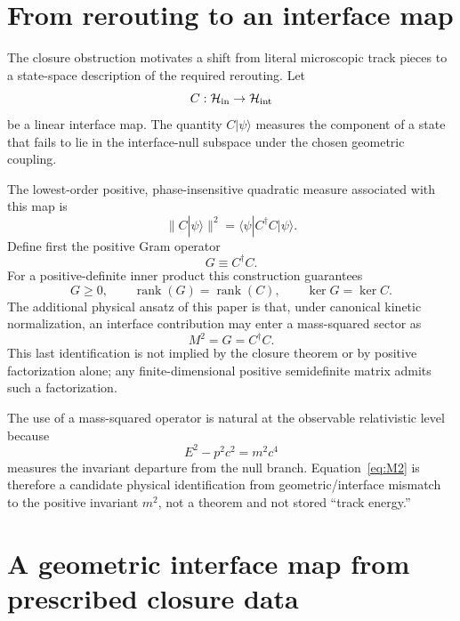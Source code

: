 \documentclass[10pt]{article}
\newcommand{\rank}{\operatorname{rank}}
\begin{document}
\section{From rerouting to an interface map}
\label{sec:interfaceMap}

The closure obstruction motivates a shift from literal microscopic track pieces to a state-space description of the required rerouting. Let
\begin{equation}
C:\mathcal H_{\rm in}\rightarrow\mathcal H_{\rm int}
\label{eq:Cgeneral}
\end{equation}
be a linear interface map. The quantity $C|\psi\rangle$ measures the component of a state that fails to lie in the interface-null subspace under the chosen geometric coupling.

The lowest-order positive, phase-insensitive quadratic measure associated with this map is
\begin{equation}
\|C|\psi\rangle\|^2
=
\langle\psi|C^\dagger C|\psi\rangle.
\label{eq:Cnorm}
\end{equation}
Define first the positive Gram operator
\begin{equation}
\boxed{
G\equiv C^\dagger C.
}
\label{eq:Gdef}
\end{equation}
For a positive-definite inner product this construction guarantees
\begin{equation}
G\ge0,
\qquad
\rank(G)=\rank(C),
\qquad
\ker G=\ker C.
\label{eq:rankKernel}
\end{equation}
The additional physical ansatz of this paper is that, under canonical kinetic normalization, an interface contribution may enter a mass-squared sector as
\begin{equation}
\boxed{M^2=G=C^\dagger C.}
\label{eq:M2}
\end{equation}
This last identification is not implied by the closure theorem or by positive factorization alone; any finite-dimensional positive semidefinite matrix admits such a factorization.

The use of a mass-squared operator is natural at the observable relativistic level because
\begin{equation}
E^2-p^2c^2=m^2c^4
\label{eq:massShell}
\end{equation}
measures the invariant departure from the null branch. Equation~\eqref{eq:M2} is therefore a candidate physical identification from geometric/interface mismatch to the positive invariant $m^2$, not a theorem and not stored ``track energy.''

\section{A geometric interface map from prescribed closure data}
\label{sec:closureMap}
\end{document}
